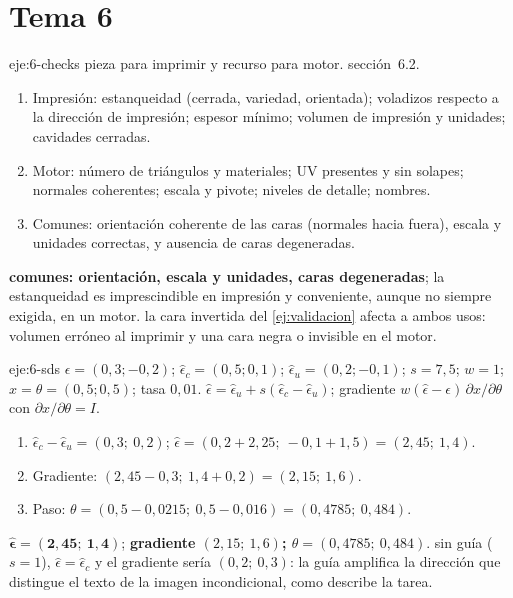 \section{Tema 6}

\begin{solucion}{eje:6-checks}
\datos pieza para imprimir y recurso para motor.
\planteamiento sección~6.2.
\pasos
\begin{enumerate}[label=\arabic*.]
  \item Impresión: estanqueidad (cerrada, variedad, orientada); voladizos respecto a la dirección de impresión; espesor mínimo; volumen de impresión y unidades; cavidades cerradas.
  \item Motor: número de triángulos y materiales; UV presentes y sin solapes; normales coherentes; escala y pivote; niveles de detalle; nombres.
  \item Comunes: orientación coherente de las caras (normales hacia fuera), escala y unidades correctas, y ausencia de caras degeneradas.
\end{enumerate}
\resultado \textbf{comunes: orientación, escala y unidades, caras degeneradas}; la estanqueidad es imprescindible en impresión y conveniente, aunque no siempre exigida, en un motor.
\comprobacion la cara invertida del \cref{ej:validacion} afecta a ambos usos: volumen erróneo al imprimir y una cara negra o invisible en el motor.
\end{solucion}

\begin{solucion}{eje:6-sds}
\datos $\epsilon=(0{,}3;-0{,}2)$; $\hat\epsilon_c=(0{,}5;0{,}1)$; $\hat\epsilon_u=(0{,}2;-0{,}1)$; $s=7{,}5$; $w=1$; $x=\theta=(0{,}5;0{,}5)$; tasa $0{,}01$.
\planteamiento $\hat\epsilon=\hat\epsilon_u+s(\hat\epsilon_c-\hat\epsilon_u)$; gradiente $w(\hat\epsilon-\epsilon)\,\partial x/\partial\theta$ con $\partial x/\partial\theta=I$.
\pasos
\begin{enumerate}[label=\arabic*.]
  \item $\hat\epsilon_c-\hat\epsilon_u=(0{,}3;\ 0{,}2)$; $\hat\epsilon=(0{,}2+2{,}25;\ -0{,}1+1{,}5)=(2{,}45;\ 1{,}4)$.
  \item Gradiente: $(2{,}45-0{,}3;\ 1{,}4+0{,}2)=(2{,}15;\ 1{,}6)$.
  \item Paso: $\theta=(0{,}5-0{,}0215;\ 0{,}5-0{,}016)=(0{,}4785;\ 0{,}484)$.
\end{enumerate}
\resultado $\mathbf{\hat\epsilon=(2{,}45;\ 1{,}4)}$; \textbf{gradiente $(2{,}15;\ 1{,}6)$; $\theta=(0{,}4785;\ 0{,}484)$}.
\comprobacion sin guía ($s=1$), $\hat\epsilon=\hat\epsilon_c$ y el gradiente sería $(0{,}2;\ 0{,}3)$: la guía amplifica la dirección que distingue el texto de la imagen incondicional, como describe la tarea.
\end{solucion}

